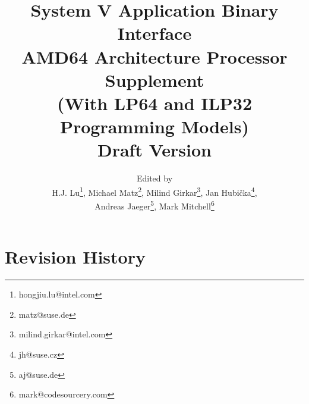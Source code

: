 \documentclass[12pt]{report}
\begin{document}
\author{Edited by\\
  H.J. Lu\thanks{hongjiu.lu@intel.com},
  Michael Matz\thanks{matz@suse.de},
  Milind Girkar\thanks{milind.girkar@intel.com},
  Jan Hubi\v{c}ka\thanks{jh@suse.cz},\\
  Andreas Jaeger\thanks{aj@suse.de},
  Mark Mitchell\thanks{mark@codesourcery.com}}

\title{System V Application Binary Interface\\
{\Large AMD64 Architecture Processor Supplement\\
(With LP64 and ILP32 Programming Models)\\
Draft Version \version}}
\maketitle
\tableofcontents
\listoftables
\listoffigures

\section*{Revision History}
\end{document}
